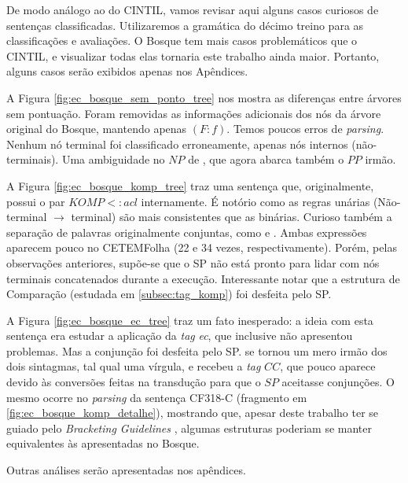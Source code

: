 De modo análogo ao do CINTIL, vamos revisar aqui alguns casos curiosos de sentenças classificadas. Utilizaremos a gramática do décimo treino para as classificações e avaliações. O Bosque tem mais casos problemáticos que o CINTIL, e visualizar todas elas tornaria este trabalho ainda maior. Portanto, alguns casos serão exibidos apenas nos Apêndices.
\begin{center}
    
\end{center}

A Figura \ref{fig:ec_bosque_sem_ponto_tree} nos mostra as diferenças entre árvores sem pontuação. Foram removidas as informações adicionais dos nós da árvore original do Bosque, mantendo apenas $(F:f)$.
Temos poucos erros de \textit{parsing}. Nenhum nó terminal foi classificado erroneamente, apenas nós internos (não-terminais). Uma ambiguidade no $NP$ de , que agora abarca também o $PP$ irmão. 

\begin{center}
    
\end{center}

A Figura \ref{fig:ec_bosque_komp_tree} traz uma sentença que, originalmente, possui o par $KOMP<:acl$ internamente. É notório como as regras unárias (Não-terminal $\rightarrow$ terminal) são mais consistentes que as binárias. Curioso também a separação de palavras originalmente conjuntas, como  e . Ambas expressões aparecem pouco no CETEMFolha (22 e 34 vezes, respectivamente). Porém, pelas observações anteriores, supõe-se que o SP não está pronto para lidar com nós terminais concatenados durante a execução. 
Interessante notar que a estrutura de Comparação (estudada em \ref{subsec:tag_komp}) foi desfeita pelo SP.

\begin{center}
    
\end{center}

A Figura \ref{fig:ec_bosque_ec_tree}
traz um fato inesperado: a ideia com esta sentença era estudar a aplicação da \textit{tag} \textit{ec}, que inclusive não apresentou problemas. Mas a conjunção  foi desfeita pelo SP.  se tornou um mero irmão dos dois sintagmas, tal qual uma vírgula, e recebeu a \textit{tag} $CC$, que pouco aparece devido às conversões feitas na transdução para que o $SP$ aceitasse conjunções. O mesmo ocorre no \textit{parsing} da sentença CF318-C (fragmento em \ref{fig:ec_bosque_komp_detalhe}), mostrando que, apesar deste trabalho ter se guiado pelo \textit{Bracketing Guidelines} \cite{bracketing_ptb}, algumas estruturas poderiam se manter equivalentes às apresentadas no Bosque.

Outras análises serão apresentadas nos apêndices.